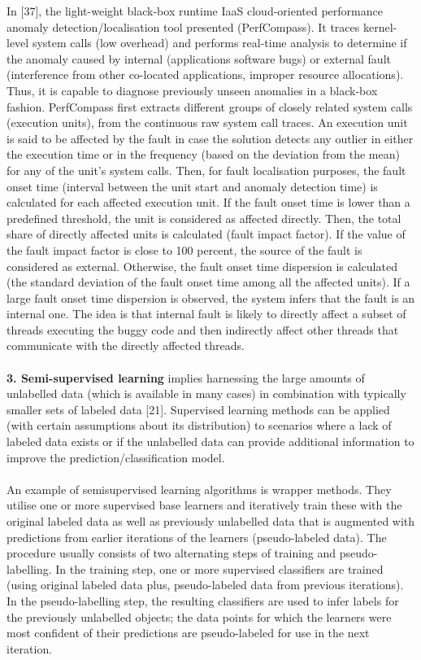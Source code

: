\documentclass[]{usiinfprospectus}
\begin{document}
In [37], the light-weight black-box runtime IaaS cloud-oriented performance anomaly detection/localisation tool presented (PerfCompass). It traces kernel-level system calls (low overhead) and performs real-time analysis to determine if the anomaly caused by internal (applications software bugs) or external fault (interference from other co-located applications, improper resource allocations). Thus, it is capable to diagnose previously unseen anomalies in a black-box fashion. PerfCompass first extracts different groups of closely related system calls (execution units), from the continuous raw system call traces. An execution unit is said to be affected by the fault in case the solution detects any outlier in either the execution time or in the frequency (based on the deviation from the mean) for any of the unit's system calls. Then, for fault localisation purposes, the fault onset time (interval between the unit start and anomaly detection time) is calculated for each affected execution unit. If the fault onset time is lower than a predefined threshold, the unit is considered as affected directly. Then, the total share of directly affected units is calculated (fault impact factor). If the value of the fault impact factor is close to 100 percent, the source of the fault is considered as external. Otherwise, the fault onset time dispersion is calculated (the standard deviation of the fault onset time among all the affected units). If a large fault onset time dispersion is observed, the system infers that the fault is an internal one. The idea is that internal fault is likely to directly affect a subset of threads executing the buggy code and then indirectly affect other threads that communicate with the directly affected threads.\\\\
%
\textbf {3. Semi-supervised learning} implies harnessing the large amounts of unlabelled data (which is available in many cases) in combination with typically smaller sets of labeled data [21]. Supervised learning methods can be applied (with certain assumptions about its distribution) to scenarios where a lack of labeled data exists or if the unlabelled data can provide additional information to improve the prediction/classification model.\\\\
%
An example of semisupervised learning algorithms is wrapper methods. They utilise one or more supervised base learners and iteratively train these with the original labeled data as well as previously unlabelled data that is augmented with predictions from earlier iterations of the learners (pseudo-labeled data). The procedure usually consists of two alternating steps of training and pseudo-labelling. In the training step, one or more supervised classifiers are trained (using original labeled data plus, pseudo-labeled data from previous iterations). In the pseudo-labelling step, the resulting classifiers are used to infer labels for the previously unlabelled objects; the data points for which the learners were most confident of their predictions are pseudo-labeled for use in the next iteration.\\\\
\end{document}
